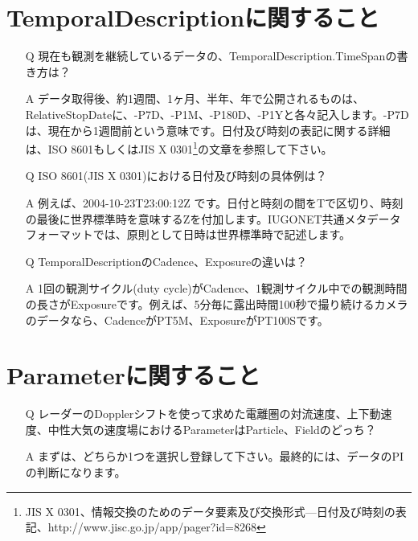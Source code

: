 \section{TemporalDescriptionに関すること}

\begin{screen}
\begin{itemize}
\item[\stepcounter{qq}Q\theqq] 現在も観測を継続しているデータの、TemporalDescription.TimeSpanの書き方は？
\item[\stepcounter{aa}A\theaa] データ取得後、約1週間、1ヶ月、半年、年で公開されるものは、RelativeStopDateに、-P7D、-P1M、-P180D、-P1Yと各々記入します。-P7Dは、現在から1週間前という意味です。日付及び時刻の表記に関する詳細は、ISO 8601もしくはJIS X 0301\footnote{JIS X 0301、情報交換のためのデータ要素及び交換形式—日付及び時刻の表記、http://www.jisc.go.jp/app/pager?id=8268}の文章を参照して下さい。
\end{itemize}
\end{screen}

\begin{screen}
\begin{itemize}
\item[\stepcounter{qq}Q\theqq] ISO 8601(JIS X 0301)における日付及び時刻の具体例は？
\item[\stepcounter{aa}A\theaa] 例えば、2004-10-23T23:00:12Z です。日付と時刻の間をTで区切り、時刻の最後に世界標準時を意味するZを付加します。IUGONET共通メタデータフォーマットでは、原則として日時は世界標準時で記述します。
\end{itemize}
\end{screen}

\begin{screen}
\begin{itemize}
\item[\stepcounter{qq}Q\theqq] TemporalDescriptionのCadence、Exposureの違いは？
\item[\stepcounter{aa}A\theaa] 1回の観測サイクル(duty cycle)がCadence、1観測サイクル中での観測時間の長さがExposureです。例えば、5分毎に露出時間100秒で撮り続けるカメラのデータなら、CadenceがPT5M、ExposureがPT100Sです。
\end{itemize}
\end{screen}

\section{Parameterに関すること}

\begin{screen}
\begin{itemize}
\item[\stepcounter{qq}Q\theqq] レーダーのDopplerシフトを使って求めた電離圏の対流速度、上下動速度、中性大気の速度場におけるParameterはParticle、Fieldのどっち？
\item[\stepcounter{aa}A\theaa] まずは、どちらか1つを選択し登録して下さい。最終的には、データのPIの判断になります。
\end{itemize}
\end{screen}


